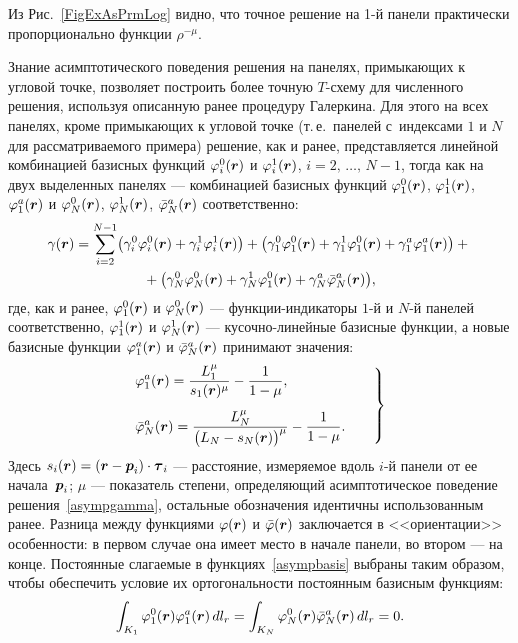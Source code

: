 \documentclass[12pt, a4paper]{article}
\renewcommand{\vec}[1]{\text{\mathversion{bold}${#1}$}}%
\begin{document}
Из Рис.~\ref{FigExAsPrmLog} видно, что точное решение на 1-й панели практически  пропорционально функции $\rho^{-\mu}$. 

Знание асимптотического поведения решения на панелях, примыкающих к угловой точке, позволяет построить более точную $T$-схему для численного решения, используя описанную ранее процедуру Галеркина. Для
этого на всех панелях, кроме примыкающих к угловой точке (т.\,е.\ панелей с~индексами $1$ и $N$ для рассматриваемого примера) решение, как и ранее, представляется линейной комбинацией базисных функций $\varphi^0_i(\vec r)$ и $\varphi^1_i(\vec r)$, $i=2,\,\ldots,\,N-1$, тогда как на двух выделенных панелях --- комбинацией базисных функций $\varphi^0_1(\vec r)$, $\varphi^1_1(\vec r)$, $\varphi^a_1(\vec r)$ и $\varphi^0_N(\vec r)$, $\varphi^1_N(\vec r)$, $\bar\varphi^a_N(\vec r)$ соответственно:
\begin{multline}
\label{asympsol}
\gamma(\vec r) = \sum\limits_{i=2}^{N-1} \bigl( \gamma_i^0 \varphi_i^0(\vec r) + \gamma_i^1 \varphi_i^1(\vec r) \bigr) + \bigl( \gamma_1^0 \varphi_1^0(\vec r) + \gamma_1^1 \varphi_1^0(\vec r) + \gamma_1^a \varphi_1^a(\vec r) \bigr) + {}\\
{} + \bigl( \gamma_N^0 \varphi_N^0(\vec r) + \gamma_N^1 \varphi_1^0(\vec r) + \gamma_N^a \bar\varphi_N^a(\vec r) \bigr),
\end{multline}
где, как и ранее, $\varphi^0_1(\vec r)$ и $\varphi^0_N(\vec r)$ --- функции-индикаторы $1$-й и $N$-й панелей соответственно, $\varphi^1_1(\vec r)$ и $\varphi^1_N(\vec r)$ --- кусочно-линейные базисные функции, а новые базисные функции $\varphi^a_1(\vec r)$ и $\bar\varphi^a_N(\vec r)$ принимают значения:
\begin{equation}
\label{asympbasis}
\left.
\begin{array}{@{}l@{}}
\displaystyle \varphi^a_1(\vec r) = \frac{L_1^\mu}{s_1(\vec r)^\mu} - \frac{1}{1-\mu}, \\[5mm]
\displaystyle \bar\varphi^a_N(\vec r) = \frac{L_N^\mu}{\bigl(L_N-s_N(\vec r)\bigr)^\mu} - \frac{1}{1-\mu}.
\end{array}
\qquad
\right\}
\end{equation}
Здесь $s_i(\vec r) =(\vec r - \vec p_i)\cdot\vec\tau_i$ --- расстояние, измеряемое вдоль $i$-й панели от ее начала~$\vec p_i$; $\mu$ --- показатель степени, определяющий асимптотическое поведение решения~\eqref{asympgamma}, остальные обозначения идентичны использованным ранее. Разница между функциями $\varphi(\vec r)$ и $\bar\varphi(\vec r)$ заключается в <<ориентации>> особенности: в первом случае она имеет место в начале панели, во втором --- на конце.
Постоянные слагаемые в функциях~\eqref{asympbasis} выбраны таким образом, чтобы обеспечить условие их ортогональности постоянным базисным функциям:
\[
\int_{K_1} \varphi_1^0(\vec r) \varphi_1^a(\vec r) \, dl_r = \int_{K_N} \varphi_N^0(\vec r) \bar\varphi_N^a(\vec r) \, dl_r =0.
\]
\end{document}

